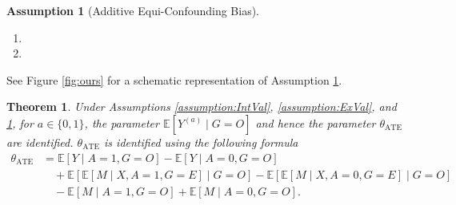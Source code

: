 \documentclass[10pt]{article}
\newtheorem{theorem}{Theorem}
\newtheorem{assumption}{Assumption}
\newcommand{\E}{\mathbb{E}}
\begin{document}
\begin{assumption}[Additive Equi-Confounding Bias]
\label{assumption:Equi::supp}
~
\begin{enumerate}[label=(\roman*)]
\item \makebox[\linewidth]{\(\begin{aligned}[t]
\E[M^{(1)}\mid  A=0, &G=O]-\E[M^{(1)}\mid  A=1, G=O]\\
&=\E[Y^{(1)}\mid  A=0, G=O]-\E[Y^{(1)}\mid  A=1, G=O],
\end{aligned}\)}
\item\makebox[\linewidth]{\(\begin{aligned}[t]
\E[M^{(0)}\mid A=0,&G=O]-\E[M^{(0)}\mid  A=1,G=O]\\
&=\E[Y^{(0)}\mid  A=0,G=O]-\E[Y^{(0)}\mid  A=1,G=O].
\end{aligned}	\)}
\end{enumerate}
\end{assumption}
See Figure \ref{fig:ours} for a schematic representation of Assumption \ref{assumption:Equi::supp}.

\begin{theorem}
\label{thm:equiATE}
Under Assumptions \ref{assumption:IntVal}, \ref{assumption:ExVal}, and \ref{assumption:Equi::supp}, for $a\in\{0,1\}$, the parameter $\E[Y^{(a)}\mid G=O]$ and hence the parameter $\theta_{\text{ATE}}$ are identified. $\theta_{\text{ATE}}$ is identified using the following formula
\begin{align*}
\theta_{\text{ATE}} 
&=
\E[Y\mid A=1,G=O]-\E[Y\mid A=0,G=O]\\
&\quad+\E[\E[M\mid X,A=1,G=E]\mid G=O]-\E[\E[M\mid X,A=0,G=E]\mid G=O]\\
&\quad-\E[M\mid A=1,G=O]+\E[M\mid A=0,G=O].
\end{align*}
\end{theorem}
\end{document}
